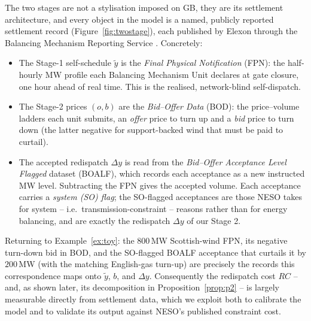 \documentclass[review,3p,times]{elsarticle}
\theoremstyle{plain}
\theoremstyle{definition}
\begin{document}
The two stages are not a stylisation imposed on GB, they are its settlement
architecture, and every object in the model is a named, publicly reported
settlement record (Figure~\ref{fig:twostage}), each published by Elexon through
the Balancing Mechanism Reporting Service \citep{elexonbmrs}. Concretely:
\begin{itemize}
\item[--] The Stage-1 self-schedule $\tilde y$ is the \emph{Final Physical
Notification} (FPN): the half-hourly MW profile each Balancing Mechanism Unit
declares at gate closure, one hour ahead of real time. This is the realised,
network-blind self-dispatch.
\item[--] The Stage-2 prices $(o,b)$ are the \emph{Bid--Offer Data} (BOD): the
price--volume ladders each unit submits, an \emph{offer} price to turn up and a
\emph{bid} price to turn down (the latter negative for support-backed wind that
must be paid to curtail).
\item[--] The accepted redispatch $\Delta y$ is read from the \emph{Bid--Offer
Acceptance Level Flagged} dataset (BOALF), which records each acceptance as a
new instructed MW level. Subtracting the FPN gives the accepted volume. Each
acceptance carries a \emph{system (SO) flag}; the SO-flagged acceptances are
those NESO takes for system -- i.e.\ transmission-constraint -- reasons rather than
for energy balancing, and are exactly the redispatch $\Delta y$ of our Stage 2.
\end{itemize}
Returning to Example~\ref{ex:toy}: the $800$\,MW Scottish-wind FPN, its negative
turn-down bid in BOD, and the SO-flagged BOALF acceptance that curtails it by
$200$\,MW (with the matching English-gas turn-up) are precisely the records this
correspondence maps onto $\tilde y$, $b$, and $\Delta y$. Consequently the
redispatch cost $RC$ -- and, as shown later, its decomposition in
Proposition~\ref{prop:p2} -- is largely measurable directly from settlement data,
which we exploit both to calibrate the model and to validate its output against
NESO's published constraint cost.
\end{document}
